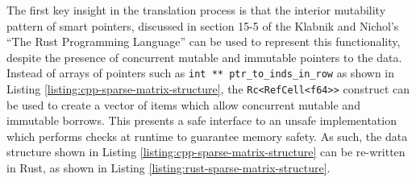 

The first key insight in the translation process is that the interior mutability pattern of smart pointers, discussed in section 15-5 of the Klabnik and Nichol's ``The Rust Programming Language'' \cite{RustProgrammingLanguage} can be used to represent this functionality, despite the presence of concurrent mutable and immutable pointers to the data. Instead of arrays of pointers such as \texttt{int ** ptr_to_inds_in_row} as shown in Listing \ref{listing:cpp-sparse-matrix-structure}, the \texttt{Rc<RefCell<f64>>} construct can be used to create a vector of items which allow concurrent mutable and immutable borrows. This presents a safe interface to an unsafe implementation which performs checks at runtime to guarantee memory safety. As such, the data structure shown in Listing \ref{listing:cpp-sparse-matrix-structure} can be re-written in Rust, as shown in Listing \ref{listing:rust-sparse-matrix-structure}.


